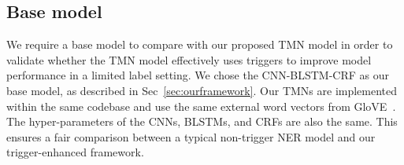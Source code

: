 \begin{table}[h]
	\begin{singlespace}
	\centering
	\caption{Statistics of the crowd-sourced entity triggers.} \label{tab:numtrig}
	\end{singlespace}
\end{table}


\subsection{Base model}
We require a base model to compare with our proposed TMN model in order to validate whether the TMN model effectively uses triggers to improve model performance in a limited label setting.
We chose the CNN-BLSTM-CRF as our base model, as described in Sec~\ref{sec:ourframework}.
Our TMNs are implemented within the same codebase and use the same external word vectors from GloVE~\citep{Pennington2014GloveGV}. The hyper-parameters of the CNNs, BLSTMs, and CRFs are also the same.
This ensures a fair comparison between a typical non-trigger NER model and our trigger-enhanced framework.



